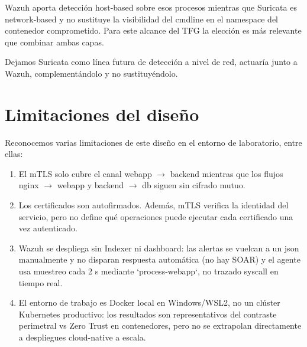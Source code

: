     Wazuh aporta detección host-based sobre esos procesos mientras que Suricata es network-based y no sustituye la visibilidad del cmdline en el namespace del contenedor comprometido. Para este alcance del TFG la elección es más relevante que combinar ambas capas. 
    
    Dejamos Suricata como línea futura de detección a nivel de red, actuaría junto a Wazuh, complementándolo y no sustituyéndolo.
    
    \section{Limitaciones del diseño}
    Reconocemos varias limitaciones de este diseño en el entorno de laboratorio, entre ellas:

    \begin{enumerate}
        \item El mTLS solo cubre el canal webapp $\rightarrow$ backend mientras que los flujos nginx $\rightarrow$ webapp y backend $\rightarrow$ db siguen sin cifrado mutuo.
        \item Los certificados son autofirmados. Además, mTLS verifica la identidad del servicio, pero no define qué operaciones puede ejecutar cada certificado una vez autenticado.
        \item Wazuh se despliega sin Indexer ni dashboard: las alertas se vuelcan a un json manualmente y no disparan respuesta automática (no hay SOAR) y el agente usa muestreo cada 2 s mediante `process-webapp`, no trazado syscall en tiempo real.
        \item El entorno de trabajo es Docker local en Windows/WSL2, no un clúster Kubernetes productivo: los resultados son representativos del contraste perimetral vs Zero Trust en contenedores, pero no se extrapolan directamente a despliegues cloud-native a escala.
    \end{enumerate}


